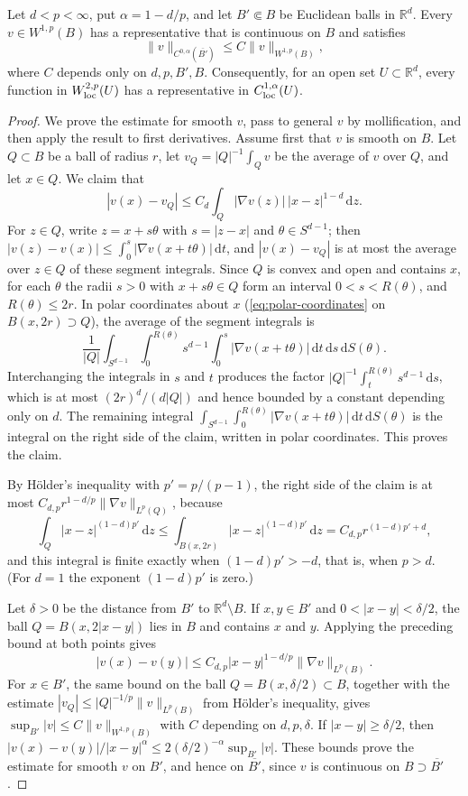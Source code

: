 \begin{lemma}\label{lem:morrey-sobolev-representative}
Let $d<p<\infty$, put $\alpha=1-d/p$, and let $B'\Subset B$ be Euclidean balls in $\mathbb R^d$. Every $v\in W^{1,p}(B)$ has a representative that is continuous on $B$ and satisfies
\[
 \|v\|_{C^{0,\alpha}(\overline{B'})}\leq C\|v\|_{W^{1,p}(B)},
\]
where $C$ depends only on $d,p,B',B$. Consequently, for an open set $U\subset\mathbb R^d$, every function in $W^{2,p}_{\mathrm{loc}}(U)$ has a representative in $C^{1,\alpha}_{\mathrm{loc}}(U)$.
\end{lemma}
\begin{proof}
We prove the estimate for smooth $v$, pass to general $v$ by mollification, and then apply the result to first derivatives. Assume first that $v$ is smooth on $B$. Let $Q\subset B$ be a ball of radius $r$, let $v_Q=|Q|^{-1}\int_Qv$ be the average of $v$ over $Q$, and let $x\in Q$. We claim that
\[
 |v(x)-v_Q|\leq C_d\int_Q|\nabla v(z)|\,|x-z|^{1-d}\,\mathrm d z.
\]
For $z\in Q$, write $z=x+s\theta$ with $s=|z-x|$ and $\theta\in S^{d-1}$; then $|v(z)-v(x)|\leq\int_0^s|\nabla v(x+t\theta)|\,\mathrm d t$, and $|v(x)-v_Q|$ is at most the average over $z\in Q$ of these segment integrals. Since $Q$ is convex and open and contains $x$, for each $\theta$ the radii $s>0$ with $x+s\theta\in Q$ form an interval $0<s<R(\theta)$, and $R(\theta)\leq2r$. In polar coordinates about $x$ (\eqref{eq:polar-coordinates} on $B(x,2r)\supset Q$), the average of the segment integrals is
\[
 \frac1{|Q|}\int_{S^{d-1}}\int_0^{R(\theta)}s^{d-1}\int_0^s|\nabla v(x+t\theta)|\,\mathrm d t\,\mathrm d s\,\mathrm d S(\theta).
\]
Interchanging the integrals in $s$ and $t$ produces the factor $|Q|^{-1}\int_t^{R(\theta)}s^{d-1}\,\mathrm d s$, which is at most $(2r)^d/(d|Q|)$ and hence bounded by a constant depending only on $d$. The remaining integral $\int_{S^{d-1}}\int_0^{R(\theta)}|\nabla v(x+t\theta)|\,\mathrm d t\,\mathrm d S(\theta)$ is the integral on the right side of the claim, written in polar coordinates. This proves the claim.

By H\"older's inequality with $p'=p/(p-1)$, the right side of the claim is at most $C_{d,p}r^{1-d/p}\|\nabla v\|_{L^p(Q)}$, because
\[
 \int_Q|x-z|^{(1-d)p'}\,\mathrm d z\leq\int_{B(x,2r)}|x-z|^{(1-d)p'}\,\mathrm d z=C_{d,p}r^{(1-d)p'+d},
\]
and this integral is finite exactly when $(1-d)p'>-d$, that is, when $p>d$. (For $d=1$ the exponent $(1-d)p'$ is zero.)

Let $\delta>0$ be the distance from $B'$ to $\mathbb R^d\setminus B$. If $x,y\in B'$ and $0<|x-y|<\delta/2$, the ball $Q=B(x,2|x-y|)$ lies in $B$ and contains $x$ and $y$. Applying the preceding bound at both points gives
\[
 |v(x)-v(y)|\leq C_{d,p}|x-y|^{1-d/p}\|\nabla v\|_{L^p(B)}.
\]
For $x\in B'$, the same bound on the ball $Q=B(x,\delta/2)\subset B$, together with the estimate $|v_Q|\leq|Q|^{-1/p}\|v\|_{L^p(B)}$ from H\"older's inequality, gives $\sup_{B'}|v|\leq C\|v\|_{W^{1,p}(B)}$ with $C$ depending on $d,p,\delta$. If $|x-y|\geq\delta/2$, then $|v(x)-v(y)|/|x-y|^\alpha\leq2(\delta/2)^{-\alpha}\sup_{B'}|v|$. These bounds prove the estimate for smooth $v$ on $B'$, and hence on $\overline{B'}$, since $v$ is continuous on $B\supset\overline{B'}$.


\end{proof}
